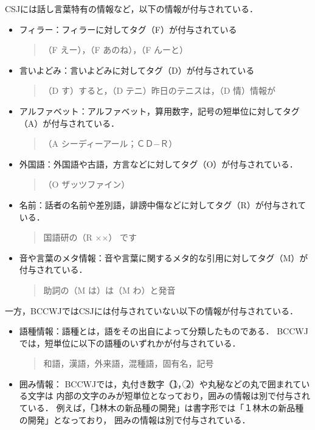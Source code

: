 \documentclass[japanese]{jnlp_1.4}
\begin{document}
CSJには話し言葉特有の情報など，以下の情報が付与されている．
\begin{itemize}
\item フィラー：フィラーに対してタグ（F）が付与されている
\begin{quote}
（F えー），（F あのね），（F んーと）
\end{quote}
\item 言いよどみ：言いよどみに対してタグ（D）が付与されている
\begin{quote}
（D す）すると，（D テニ）昨日のテニスは，（D 情）情報が
\end{quote}
\item アルファベット：アルファベット，算用数字，記号の短単位に対してタグ（A）が付与されている．
\begin{quote}
（A シーディーアール；ＣＤ−Ｒ）
\end{quote}
\item 外国語：外国語や古語，方言などに対してタグ（O）が付与されている．
\begin{quote}
（O ザッツファイン）
\end{quote}
\item 名前：話者の名前や差別語，誹謗中傷などに対してタグ（R）が付与されている．
\begin{quote}
国語研の（R ××） です
\end{quote}
\item 音や言葉のメタ情報：音や言葉に関するメタ的な引用に対してタグ（M）が付与されている．
\begin{quote}
助詞の（M は）は（M わ）と発音
\end{quote}
\end{itemize}
一方，BCCWJではCSJには付与されていない以下の情報が付与されている．
\begin{itemize}
\item 語種情報：語種とは，語をその出自によって分類したものである．
BCCWJでは，短単位に以下の語種のいずれかが付与されている．
\begin{quote}
和語，漢語，外来語，混種語，固有名，記号
\end{quote}
\item 囲み情報：
BCCWJでは，丸付き数字（\textcircled{\footnotesize 1}，\textcircled{\footnotesize 2}）や丸秘などの丸で囲まれている文字は
内部の文字のみが短単位となっており，囲みの情報は別で付与されている．
例えば，「\textcircled{\footnotesize 1}林木の新品種の開発」は書字形では「１林木の新品種の開発」となっており，
囲みの情報は別で付与されている．
\end{itemize}
\end{document}
